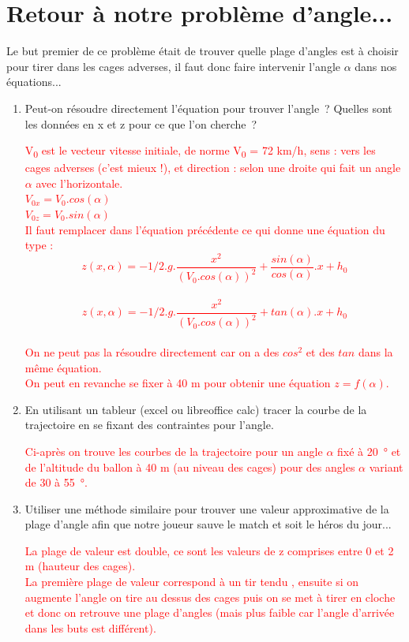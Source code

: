 \documentclass[french,a4paper,10pt]{article}
\begin{document}
\section{Retour à notre problème d’angle...}
Le but premier de ce problème était de trouver quelle plage d'angles est à choisir pour tirer dans les cages adverses, il faut donc faire intervenir l'angle $\alpha$ dans nos équations...

\begin{enumerate}
    \item Peut-on résoudre directement l’équation pour trouver l’angle ? Quelles sont les données en x et z pour ce que l’on cherche ?\\
\begin{reponse}
    \textcolor{red}{V\textsubscript{0} est le vecteur vitesse initiale, de norme V\textsubscript{0} = 72 km/h, sens : vers les cages adverses (c'est mieux !), et direction : selon une droite qui fait un angle $\alpha$ avec l'horizontale.\\
$V_{0x} = V_0 . cos(\alpha)$\\
$V_{0z} = V_0 . sin(\alpha)$\\
Il faut remplacer dans l'équation précédente ce qui donne une équation du type :\\
$$z(x,\alpha) = - 1/2 . g . \frac{x^2}{(V_{0}. cos(\alpha))^2} + \frac{sin(\alpha)}{cos(\alpha)} . x + h_0$$\\
$$z(x,\alpha) = - 1/2 . g . \frac{x^2}{(V_{0}. cos(\alpha))^2} + tan(\alpha) . x + h_0$$\\
On ne peut pas la résoudre directement car on a des $cos^2$ et des $tan$ dans la même équation.\\
On peut en revanche se fixer à 40 m pour obtenir une équation $z = f(\alpha)$.}
\end{reponse}
    \item En utilisant un tableur (excel ou libreoffice calc) tracer la courbe de la trajectoire en se fixant des contraintes pour l’angle.\\
\begin{reponse}
\textcolor{red}{Ci-après on trouve les courbes de la trajectoire pour un angle $\alpha$ fixé à 20~° et de l'altitude du ballon à 40 m (au niveau des cages) pour des angles $\alpha$ variant de 30 à 55~°.}
\end{reponse}

    \item Utiliser une méthode similaire pour trouver une valeur approximative de la plage d’angle afin que notre joueur sauve le match et soit le héros du jour...\\
\begin{reponse}
\textcolor{red}{La plage de valeur est double, ce sont les valeurs de z comprises entre 0 et 2 m (hauteur des cages).\\
La première plage de valeur correspond à un tir \og tendu \fg{}, ensuite si on augmente l'angle on tire au dessus des cages puis on se met à tirer \og en cloche \fg{} et donc on retrouve une plage d'angles (mais plus faible car l'angle d'arrivée dans les buts est différent).}
\end{reponse}


\end{enumerate}
\end{document}
